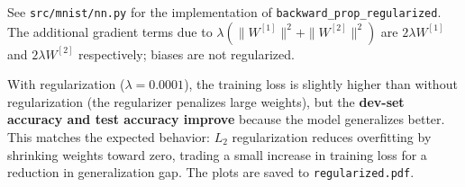 \begin{answer}
See \texttt{src/mnist/nn.py} for the implementation of \texttt{backward\_prop\_regularized}. The additional gradient terms due to $\lambda(\|W^{[1]}\|^2 + \|W^{[2]}\|^2)$ are $2\lambda W^{[1]}$ and $2\lambda W^{[2]}$ respectively; biases are not regularized.

With regularization ($\lambda = 0.0001$), the training loss is slightly higher than without regularization (the regularizer penalizes large weights), but the \textbf{dev-set accuracy and test accuracy improve} because the model generalizes better. This matches the expected behavior: $L_2$ regularization reduces overfitting by shrinking weights toward zero, trading a small increase in training loss for a reduction in generalization gap. The plots are saved to \texttt{regularized.pdf}.
\end{answer}

